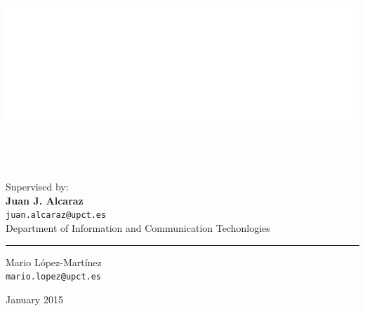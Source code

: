 \graphicspath{ {img/} }

\makeatletter                   
\def\printauthor{%
    {\large \@author}}          
\makeatother

\author{%

    }
\begin{titlingpage}
\BgThispage
{}
\vspace*{0.25\textheight}
\noindent
\includegraphics{logo.eps}\\\\ 
\textcolor{white}{\Huge\textbf{{Coexistence policies in cognitive radio}}}\vspace*{0.25cm}\\
\noindent
\hspace*{1cm}\textcolor{white}{\normalsize{Ph.D. dissertation (draft)}}
\vspace*{3cm}\par
\noindent
\hspace*{3.5cm}
\begin{minipage}{0.35\linewidth}
    \begin{flushright}
    Supervised by: \\
    \textbf{Juan J. Alcaraz}\\
    \texttt{juan.alcaraz@upct.es}
    \vspace*{1cm}\\
    Department of Information and Communication Techonlogies\\
    \end{flushright}
\end{minipage} \hspace{15pt}
%
\begin{minipage}{0.02\linewidth}
    \rule{1pt}{175pt}
\end{minipage} \hspace{0pt}
%
\begin{minipage}{0.63\linewidth}
\vspace{8pt}
    \Large{Mario L\'{o}pez-Mart\'{i}nez} \\
    \large\texttt{mario.lopez@upct.es} \\
\end{minipage}
\vfill
\hspace{0.5\linewidth}January 2015
\end{titlingpage}
\restoregeometry